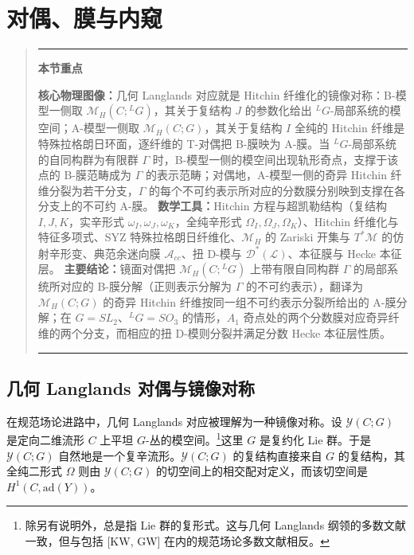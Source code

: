 \documentclass[11pt,a4paper]{article}
\newenvironment{keytakeaway}
  {\par\medskip\begin{quote}\small\noindent
   \rule{\linewidth}{0.6pt}\par\nopagebreak\smallskip\noindent
   \textbf{本节重点}\par\nobreak\smallskip\noindent\ignorespaces}
  {\par\smallskip\noindent\rule{\linewidth}{0.6pt}\end{quote}\medskip}
\begin{document}

\section{对偶、膜与内窥}

\begin{keytakeaway}
\textbf{核心物理图像：}几何 Langlands 对应就是 Hitchin 纤维化的镜像对称：B-模型一侧取 $\mathcal{M}_H(C;{}^{L}G)$，其关于复结构 $J$ 的参数化给出 ${}^{L}G$-局部系统的模空间；A-模型一侧取 $\mathcal{M}_H(C;G)$，其关于复结构 $I$ 全纯的 Hitchin 纤维是特殊拉格朗日环面，逐纤维的 T-对偶把 B-膜映为 A-膜。当 ${}^{L}G$-局部系统的自同构群为有限群 $\Gamma$ 时，B-模型一侧的模空间出现轨形奇点，支撑于该点的 B-膜范畴成为 $\Gamma$ 的表示范畴；对偶地，A-模型一侧的奇异 Hitchin 纤维分裂为若干分支，$\Gamma$ 的每个不可约表示所对应的分数膜分别映到支撑在各分支上的不可约 A-膜。
\textbf{数学工具：}Hitchin 方程与超凯勒结构（复结构 $I,J,K$，实辛形式 $\omega_I,\omega_J,\omega_K$，全纯辛形式 $\Omega_I,\Omega_J,\Omega_K$）、Hitchin 纤维化与特征多项式、SYZ 特殊拉格朗日纤维化、$\mathcal{M}_H$ 的 Zariski 开集与 $T^*\mathcal{M}$ 的仿射辛形变、典范余迷向膜 $\mathcal{A}_{cc}$、扭 D-模与 $\mathcal{D}^*(\mathcal{L})$、本征膜与 Hecke 本征层。
\textbf{主要结论：}镜面对偶把 $\mathcal{M}_H(C;{}^{L}G)$ 上带有限自同构群 $\Gamma$ 的局部系统所对应的 B-膜分解（正则表示分解为 $\Gamma$ 的不可约表示），翻译为 $\mathcal{M}_H(C;G)$ 的奇异 Hitchin 纤维按同一组不可约表示分裂所给出的 A-膜分解；在 $G=SL_2$、${}^{L}G=SO_3$ 的情形，$A_1$ 奇点处的两个分数膜对应奇异纤维的两个分支，而相应的扭 D-模则分裂并满足分数 Hecke 本征层性质。
\end{keytakeaway}

\subsection{几何 Langlands 对偶与镜像对称}

在规范场论进路中，几何 Langlands 对应被理解为一种镜像对称。设 $\mathcal{Y}(C;G)$ 是定向二维流形 $C$ 上平坦 $G$-丛的模空间。\footnote{除另有说明外，总是指 Lie 群的复形式。这与几何 Langlands 纲领的多数文献一致，但与包括 [KW, GW] 在内的规范场论多数文献相反。}这里 $G$ 是复约化 Lie 群。于是 $\mathcal{Y}(C;G)$ 自然地是一个复辛流形。$\mathcal{Y}(C;G)$ 的复结构直接来自 $G$ 的复结构，其全纯二形式 $\Omega$ 则由 $\mathcal{Y}(C;G)$ 的切空间上的相交配对定义，而该切空间是 $H^1(C,\mathrm{ad}(Y))$。
\end{document}
